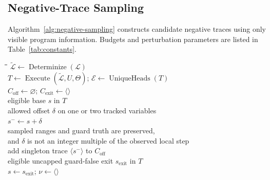 \subsection{Negative-Trace Sampling}
\label{app:negative-sampling}

Algorithm~\ref{alg:negative-sampling} constructs candidate negative traces
using only visible program information.  Budgets and perturbation parameters
are listed in Table~\ref{tab:constants}.

\begin{algorithm}[H]
\caption{Target-hidden candidate-negative sampling}
\label{alg:negative-sampling}
\begin{algorithmic}
\hspace{1.8em}\=\hspace{1.2em}\=\hspace{1.2em}\=\kill
{}
\algline \(\widetilde{\mathcal L}\leftarrow\operatorname{Determinize}(\mathcal L)\)
  \\
\algline \(T\leftarrow\operatorname{Execute}(\widetilde{\mathcal L},U,\Theta)\);
  \(\mathcal E\leftarrow\operatorname{UniqueHeads}(T)\)\\
\algline \(C_{\mathrm{off}}\leftarrow\varnothing\); \(C_{\mathrm{exit}}\leftarrow\langle\rangle\)\\
\algline {} eligible base \(s\) in \(T\) 
  \\
\algline \algind {} allowed offset \(\delta\) on one or two tracked variables \\
\algline \algind \algind \(s^-\leftarrow s+\delta\)
  \\
\algline \algind \algind {} sampled ranges and guard truth are preserved,\\
\algline \algind \algind \quad and \(\delta\) is not an integer multiple of the observed local step \\
\algline \algind \algind \quad add singleton trace \(\langle s^-\rangle\) to \(C_{\mathrm{off}}\)\\
\algline {} eligible uncapped guard-false exit \(s_{\mathrm{exit}}\) in \(T\) 
  \\
\algline \algind \(s\leftarrow s_{\mathrm{exit}}\); \(\nu\leftarrow\langle\rangle\)\\

\end{algorithmic}
\end{algorithm}

